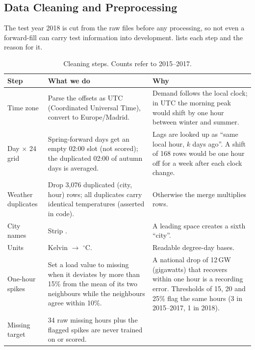 \subsection{Data Cleaning and Preprocessing}
\label{sec:preprocessing}

The test year 2018 is cut from the raw files before any processing, so not even a
forward-fill can carry test information into development.  lists each step and
the reason for it.

\begin{table}[H]
  \centering
  \small
  \caption{Cleaning steps. Counts refer to 2015--2017.}
  \label{tab:cleaning}
  \begin{tabularx}{\linewidth}{@{}p{2.6cm} Y Y@{}}
    \toprule
    Step & What we do & Why \\
    \midrule
    Time zone & Parse the  offsets as UTC (Coordinated Universal Time), convert to Europe/Madrid.
      & Demand follows the local clock; in UTC the morning peak would shift by one hour between
        winter and summer. \\
    Day $\times$ 24 grid & Spring-forward days get an empty 02:00 slot (not scored); the duplicated
      02:00 of autumn days is averaged.
      & Lags are looked up as ``same local hour, $k$ days ago''. A shift of 168 rows would be one
        hour off for a week after each clock change. \\
    Weather duplicates & Drop 3{,}076 duplicated (city, hour) rows; all duplicates carry identical
      temperatures (asserted in code).
      & Otherwise the merge multiplies rows. \\
    City names & Strip . & A leading space creates a sixth ``city''. \\
    Units & Kelvin $\rightarrow$ $^\circ$C. & Readable degree-day bases. \\
    One-hour spikes & Set a load value to missing when it deviates by more than 15\% from the mean
      of its two neighbours while the neighbours agree within 10\%.
      & A national drop of 12\,GW (gigawatts) that recovers within one hour is a recording error. Thresholds of
        15, 20 and 25\% flag the same hours (3 in 2015--2017, 1 in 2018). \\
    Missing target & 34 raw missing hours plus the flagged spikes are never trained on or scored.

\end{tabularx}
\end{table}
